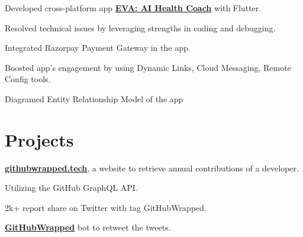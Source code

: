 \documentclass[]{deedy-resume-reversed}
\begin{document}
\begin{minipage}[t]{0.6\textwidth}
\begin{tightemize}
\item Developed cross-platform app \textbf{\href{https://www.thehealthycompany.in/eva/}{EVA: AI Health Coach}} with Flutter. 
\item Resolved technical issues by leveraging strengths in coding and debugging.
\item Integrated Razorpay Payment Gateway in the app.
\item Boosted app's engagement by using Dynamic Links, Cloud Messaging, Remote Config tools. 
\item Diagramed Entity Relationship Model of the app
\end{tightemize}
\sectionsep



\section{Projects}
\descript{
}
\begin{tightemize}
\item \textbf{\href{https://githubwrapped.tech/}{githubwrapped.tech}}, a website to retrieve annual contributions of a developer.
\item Utilizing the GitHub GraphQL API.
\item 2k+ report share on Twitter with tag GitHubWrapped. 
\item\textbf{\href{https://twitter.com/GitHubWrapped}{GitHubWrapped}} bot to retweet the tweets.
\end{tightemize}
\sectionsep


\end{minipage}
\end{document}
